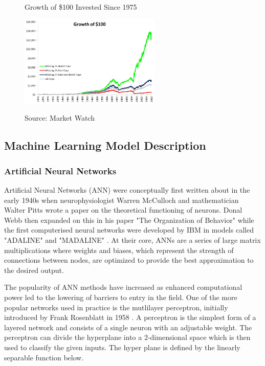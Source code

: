 \documentclass[11pt]{article}
\begin{document}
\begin{figure}[h]
    \centering\
	\caption{Growth of \$100 Invested Since 1975}
    \includegraphics[width=0.6\textwidth]{beststockdays}    
    \label{fig:beststockdays}
	\caption*{\small Source: Market Watch\cite{bestdays}}
\end{figure}

\subsection{Machine Learning Model Description}

\subsubsection{Artificial Neural Networks}
Artificial Neural Networks (ANN) were conceptually first written about in the early 1940s \cite{Widrow1990} when neurophysiologist Warren McCulloch and mathematician Walter Pitts wrote a paper on the theoretical functioning of neurons. Donal Webb then expanded on this in his paper "The Organization of Behavior" while the first computerised neural networks were developed by IBM in models called "ADALINE" and "MADALINE" \cite{Widrow1990}. At their core, ANNs are a series of large matrix multiplications where weights and biases, which represent the strength of connections between nodes, are optimized to provide the best approximation to the desired output.\par The popularity of ANN methods have increased as enhanced computational power led to the lowering of barriers to entry in the field. One of the more popular networks used in practice is the mutlilayer perceptron, initially introduced by Frank Rosenblatt in 1958 \cite{Rosenblatt1958}. A perceptron is the simplest form of a layered network and consists of a single neuron with an adjustable weight. The perceptron can divide the hyperplane into a 2-dimensional space which is then used to classify the given inputs. The hyper plane is defined by the linearly separable function below.
\end{document}
